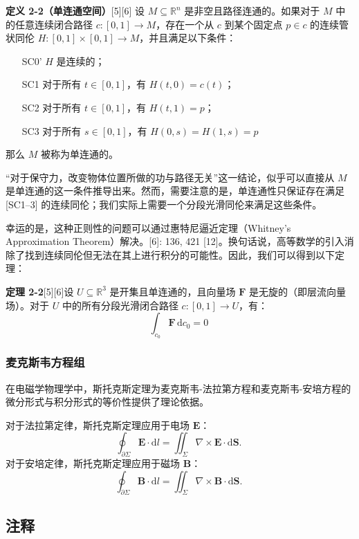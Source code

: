 \textbf{定义 2-2（单连通空间）}[5][6]  设 \(M \subseteq \mathbb{R}^n\) 是非空且路径连通的。如果对于 \(M\) 中的任意连续闭合路径 \(c: [0, 1] \to M\)，存在一个从 \(c\) 到某个固定点 \(p \in c\) 的连续管状同伦 \(H: [0, 1] \times [0, 1] \to M\)，并且满足以下条件：

\begin{itemize}
\item [SC0'] \(H\) 是连续的；
\item [SC1] 对于所有 \(t \in [0, 1]\)，有 \(H(t, 0) = c(t)\)；
\item [SC2] 对于所有 \(t \in [0, 1]\)，有 \(H(t, 1) = p\)；
\item [SC3] 对于所有 \(s \in [0, 1]\)，有 \(H(0, s) = H(1, s) = p\)
\end{itemize}

那么 \(M\) 被称为单连通的。

“对于保守力，改变物体位置所做的功与路径无关”这一结论，似乎可以直接从 \(M\) 是单连通的这一条件推导出来。然而，需要注意的是，单连通性只保证存在满足 [SC1–3] 的连续同伦；我们实际上需要一个分段光滑同伦来满足这些条件。

幸运的是，这种正则性的问题可以通过惠特尼逼近定理（Whitney's Approximation Theorem）解决。[6]: 136, 421 [12]。换句话说，高等数学的引入消除了找到连续同伦但无法在其上进行积分的可能性。因此，我们可以得到以下定理：

\textbf{定理 2-2}[5][6]设 \(U \subseteq \mathbb{R}^3\) 是开集且单连通的，且向量场 \(\mathbf{F}\) 是无旋的（即层流向量场）。对于 \(U\) 中的所有分段光滑闭合路径 \(c: [0, 1] \to U\)，有：
\[
\int_{c_0} \mathbf{F} \, \mathrm{d}c_0 = 0~
\]
\subsubsection{麦克斯韦方程组}
在电磁学物理学中，斯托克斯定理为麦克斯韦-法拉第方程和麦克斯韦-安培方程的微分形式与积分形式的等价性提供了理论依据。

对于法拉第定律，斯托克斯定理应用于电场 \(\mathbf{E}\)：
\[
\oint_{\partial \Sigma} \mathbf{E} \cdot \mathrm{d} l = \iint_{\Sigma} \nabla \times \mathbf{E} \cdot \mathrm{d} \mathbf{S}.~
\]
对于安培定律，斯托克斯定理应用于磁场 \(\mathbf{B}\)：
\[
\oint_{\partial \Sigma} \mathbf{B} \cdot \mathrm{d} l = \iint_{\Sigma} \nabla \times \mathbf{B} \cdot \mathrm{d} \mathbf{S}.~
\]

\subsection{注释}

